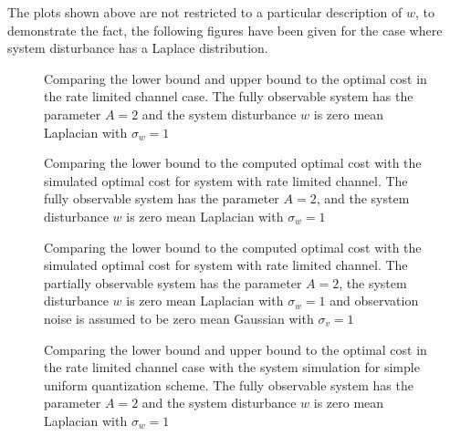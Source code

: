 \documentclass[12pt]{caltech_thesis_progress2}
\begin{document}
		The plots shown above are not restricted to a particular description of $w$, to demonstrate the fact, the following figures have been given for the case where system disturbance has a Laplace distribution. 
		\begin{figure}[H]

			  \centering
%			  
			  \tiny{
			}
			  \caption{Comparing the lower bound and upper bound to the optimal cost in the rate limited channel case. The fully observable system has the parameter $A = 2$ and the system disturbance $w$ is zero mean Laplacian with $\sigma_{w} = 1$}
			 \label{lower_upper}
		\end{figure}	
		\begin{figure}[H]
			  \centering
%			  
			  \tiny{
			}
			  \caption{Comparing the lower bound to the computed optimal cost with the simulated optimal cost for system with rate limited channel. The fully observable system has the parameter $A = 2$, and the system disturbance $w$ is zero mean Laplacian with $\sigma_{w} = 1$}
			 \label{lowerboundQL_sim}
		\end{figure}	
		\begin{figure}[H]
			  \centering
%			  
			  \tiny{
			}
			  \caption{Comparing the lower bound to the computed optimal cost with the simulated optimal cost for system with rate limited channel. The partially observable system has the parameter $A = 2$, the system disturbance $w$ is zero mean Laplacian with $\sigma_{w} = 1$ and observation noise is assumed to be zero mean Gaussian with $\sigma_{v} = 1$}
			 \label{lowerboundQL_sim_v}
		\end{figure}	
%
		\begin{figure}[H]
			  \centering
%			  
			  \tiny{
			}
			  \caption{Comparing the lower bound and upper bound to the optimal cost in the rate limited channel case with the system simulation for simple uniform quantization scheme. The fully observable system has the parameter $A = 2$ and the system disturbance $w$ is zero mean Laplacian with $\sigma_{w} = 1$}
			 \label{lower_upper_simL}
		\end{figure}		
\end{document}
